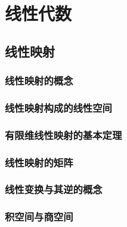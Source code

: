 \documentclass{tufte-book}
\begin{document}
\part{线性代数}

\chapter{线性映射}
\section{线性映射的概念}
\section{线性映射构成的线性空间}
\section{有限维线性映射的基本定理}
\section{线性映射的矩阵}
\section{线性变换与其逆的概念}
\section{积空间与商空间}
\end{document}
